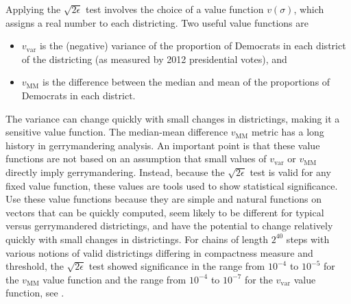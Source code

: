 \documentclass[12pt]{article}
\begin{document}
\begin{example}
Applying the \( \sqrt{2\epsilon} \) test involves the choice of a value
function \( v(\sigma) \), which assigns a real number to each
districting.  Two useful value functions are
\begin{itemize}
    \item
        \( v_{\text{var}} \) is the (negative) variance of the
        proportion of Democrats in each district of the districting (as
        measured by 2012 presidential votes), and
    \item
        \( v_{\text{MM}} \) is the difference between the median and
        mean of the proportions of Democrats in each district.
\end{itemize}
The variance can change quickly with small changes in districtings,
making it a sensitive value function.  The median-mean difference \( v_{\text
{MM}} \) metric has a long history in gerrymandering analysis. An
important point is that these value functions are not based on an
assumption that small values of \( v_{\text {var}} \) or \( v_{\text{MM}}
\) directly imply gerrymandering.  Instead, because the \( \sqrt{2\epsilon}
\) test is valid for any fixed value function, these values are tools
used to show statistical significance.  Use these value functions
because they are simple and natural functions on vectors that can be
quickly computed, seem likely to be different for typical versus
gerrymandered districtings, and have the potential to change relatively
quickly with small changes in districtings.  For chains of length \( 2^{40}
\) steps with various notions of valid districtings differing in
compactness measure and threshold, the \( \sqrt{2\epsilon} \) test
showed significance in the range from \( 10^{-4} \) to \( 10^ {-5} \)
for the \( v_{\text {MM}} \) value function and the range from \( 10^{-4}
\) to \( 10^{-7} \) for the \( v_{\text{var}} \) value function, see
\cite{chikina2860si}.


\end{example}
\end{document}
